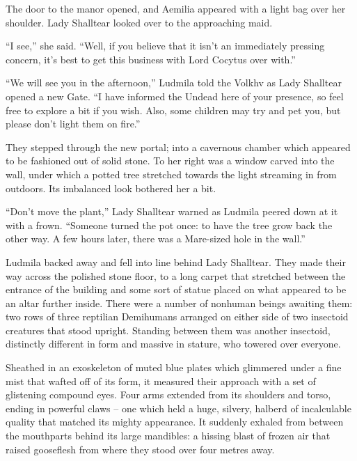  

The door to the manor opened, and Aemilia appeared with a light bag over her shoulder. Lady Shalltear looked over to the approaching maid.

 

“I see,” she said. “Well, if you believe that it isn’t an immediately pressing concern, it’s best to get this business with Lord Cocytus over with.”

 

“We will see you in the afternoon,” Ludmila told the Volkhv as Lady Shalltear opened a new Gate. “I have informed the Undead here of your presence, so feel free to explore a bit if you wish. Also, some children may try and pet you, but please don’t light them on fire.”

 

They stepped through the new portal; into a cavernous chamber which appeared to be fashioned out of solid stone. To her right was a window carved into the wall, under which a potted tree stretched towards the light streaming in from outdoors. Its imbalanced look bothered her a bit.

 

“Don’t move the plant,” Lady Shalltear warned as Ludmila peered down at it with a frown. “Someone turned the pot once: to have the tree grow back the other way. A few hours later, there was a Mare-sized hole in the wall.”

 

Ludmila backed away and fell into line behind Lady Shalltear. They made their way across the polished stone floor, to a long carpet that stretched between the entrance of the building and some sort of statue placed on what appeared to be an altar further inside. There were a number of nonhuman beings awaiting them: two rows of three reptilian Demihumans arranged on either side of two insectoid creatures that stood upright. Standing between them was another insectoid, distinctly different in form and massive in stature, who towered over everyone.

 

Sheathed in an exoskeleton of muted blue plates which glimmered under a fine mist that wafted off of its form, it measured their approach with a set of glistening compound eyes. Four arms extended from its shoulders and torso, ending in powerful claws – one which held a huge, silvery, halberd of incalculable quality that matched its mighty appearance. It suddenly exhaled from between the mouthparts behind its large mandibles: a hissing blast of frozen air that raised gooseflesh from where they stood over four metres away.


